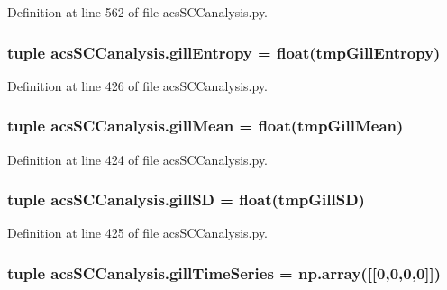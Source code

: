 Definition at line 562 of file acs\+S\+C\+Canalysis.\+py.

\hypertarget{a00130_a4c214eb4f6812d6182bae32715bce3ad}{
\subsubsection[{gill\+Entropy}]{\setlength{\rightskip}{0pt plus 5cm}tuple acs\+S\+C\+Canalysis.\+gill\+Entropy = float(tmp\+Gill\+Entropy)}}\label{a00130_a4c214eb4f6812d6182bae32715bce3ad}


Definition at line 426 of file acs\+S\+C\+Canalysis.\+py.

\hypertarget{a00130_a4e862896701636d17752f14810ff687f}{
\subsubsection[{gill\+Mean}]{\setlength{\rightskip}{0pt plus 5cm}tuple acs\+S\+C\+Canalysis.\+gill\+Mean = float(tmp\+Gill\+Mean)}}\label{a00130_a4e862896701636d17752f14810ff687f}


Definition at line 424 of file acs\+S\+C\+Canalysis.\+py.

\hypertarget{a00130_acdb3e72aea08c29494799fd08763b406}{
\subsubsection[{gill\+S\+D}]{\setlength{\rightskip}{0pt plus 5cm}tuple acs\+S\+C\+Canalysis.\+gill\+S\+D = float(tmp\+Gill\+S\+D)}}\label{a00130_acdb3e72aea08c29494799fd08763b406}


Definition at line 425 of file acs\+S\+C\+Canalysis.\+py.

\hypertarget{a00130_a99669fe823cebc560b46c3746f9183e7}{
\subsubsection[{gill\+Time\+Series}]{\setlength{\rightskip}{0pt plus 5cm}tuple acs\+S\+C\+Canalysis.\+gill\+Time\+Series = np.\+array(\mbox{[}\mbox{[}0,0,0,0\mbox{]}\mbox{]})}}\label{a00130_a99669fe823cebc560b46c3746f9183e7}


